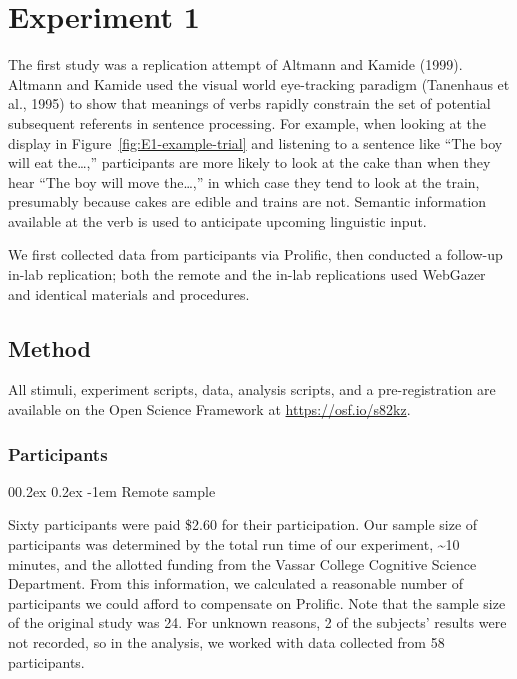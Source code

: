 \documentclass[
  man,floatsintext]{apa6}
\makeatletter
\let\oldparagraph\paragraph
\renewcommand{\paragraph}[1]{\oldparagraph{#1}\mbox{}}
\renewcommand{\paragraph}{\@startsection{paragraph}{4}{\parindent}%
  {0\baselineskip \@plus 0.2ex \@minus 0.2ex}%
  {-1em}%
  {\normalfont\normalsize\bfseries\itshape\typesectitle}}
\makeatother
\begin{document}
\section{Experiment 1}\label{experiment-1}

The first study was a replication attempt of
Altmann and Kamide (1999). Altmann and Kamide used the
visual world eye-tracking paradigm (Tanenhaus et al., 1995) to show that
meanings of verbs rapidly constrain the set of potential subsequent
referents in sentence processing. For example, when looking at the
display in Figure~\ref{fig:E1-example-trial} and listening to a sentence like
``The boy will eat the\ldots,'' participants are more likely to look at the cake than
when they hear ``The boy will move the\ldots,'' in which case they tend to look at the
train, presumably because cakes are edible and trains are not. Semantic
information available at the verb is used to anticipate upcoming
linguistic input.

We first collected data from participants via Prolific, then conducted a follow-up in-lab replication; both the remote and the in-lab replications used WebGazer and identical materials and procedures.

\subsection{Method}\label{method}

All stimuli, experiment scripts, data, analysis scripts, and a
pre-registration are available on the Open Science Framework at
\url{https://osf.io/s82kz}.

\subsubsection{Participants}\label{participants-1}

\paragraph{Remote sample}\label{remote-sample}

Sixty participants were paid \$2.60 for their participation. Our sample size
of participants was determined by the total run time of our experiment,
\textasciitilde10 minutes, and the allotted funding from the Vassar College Cognitive
Science Department. From this information, we calculated a reasonable
number of participants we could afford to compensate on Prolific. Note
that the sample size of the original study was 24. For unknown reasons,
2 of the subjects' results were not recorded, so in the analysis, we
worked with data collected from 58 participants.
\end{document}
